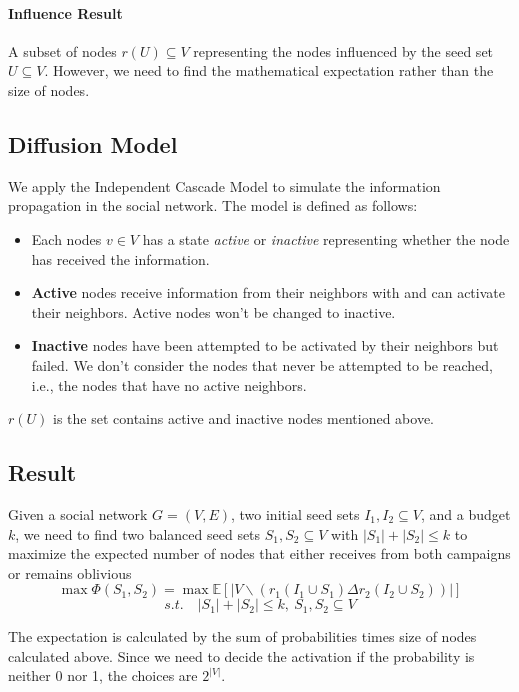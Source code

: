 \documentclass{article}
\begin{document}
\paragraph{Influence Result} A subset of nodes $r(U) \subseteq V$ representing the nodes influenced by the seed set $U \subseteq V$. However, we need to find the mathematical expectation rather than the size of nodes.

\subsection{Diffusion Model}
We apply the Independent Cascade Model to simulate the information propagation in the social network. The model is defined as follows:

\begin{itemize}
    \item Each nodes $v \in V$ has a state \textit{active} or \textit{inactive} representing whether the node has received the information.
    \item \textbf{Active} nodes receive information from their neighbors with and can activate their neighbors. Active nodes won't be changed to inactive.
    \item \textbf{Inactive} nodes have been attempted to be activated by their neighbors but failed. We don't consider the nodes that never be attempted to be reached, i.e., the nodes that have no active neighbors.
\end{itemize}

$r(U)$ is the set contains active and inactive nodes mentioned above.

\subsection{Result}

Given a social network $G = (V, E)$, two initial seed sets $I_1, I_2 \subseteq V$, and a budget $k$, we need to find two balanced seed sets $S_1, S_2 \subseteq V$ with $|S_1| + |S_2| \leq k$ to maximize the expected number of nodes that either receives from both campaigns or remains oblivious
\[
    \max \Phi \left( S_1, S_2 \right) = \max \mathbb{E} \left[ |V \backslash (r_1(I_1\cup S_1) \Delta r_2(I_2\cup S_2))| \right]
\]
\[
    s.t.\quad |S_1| + |S_2| \leq k, \  S_1, S_2 \subseteq V
\]

The expectation is calculated by the sum of probabilities times size of nodes calculated above. Since we need to decide the activation if the probability is neither 0 nor 1, the choices are $2^{|V|}$.
\end{document}
